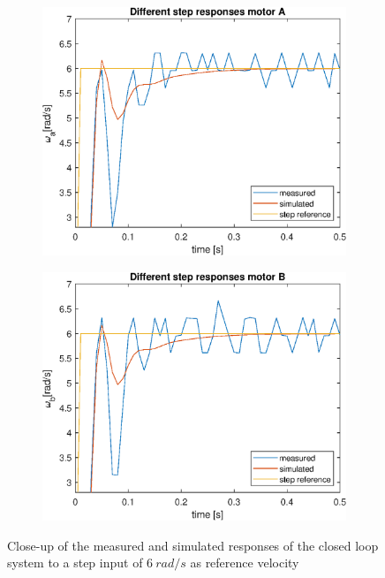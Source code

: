 \documentclass[a4paper,kul]{kulakarticle} %
\begin{document}
\begin{figure}[htp!]
	\centering
	\begin{subfigure}[b]{0.49\textwidth}
		\centering
		\includegraphics[width=\linewidth]{comparison_stepresponseA_zoom.eps}
		
	\end{subfigure}
	\hfill
	\begin{subfigure}[b]{0.49\textwidth}  
		\centering
		\includegraphics[width=\linewidth]{comparison_stepresponseB_zoom.eps}
		
	\end{subfigure}
	\caption{Close-up of the measured and simulated responses of the closed loop system to a step input of $\SI{6}{rad/s}$ as reference velocity}
	\label{fig:comparisonstepresponsezoom}
\end{figure}
\end{document}
